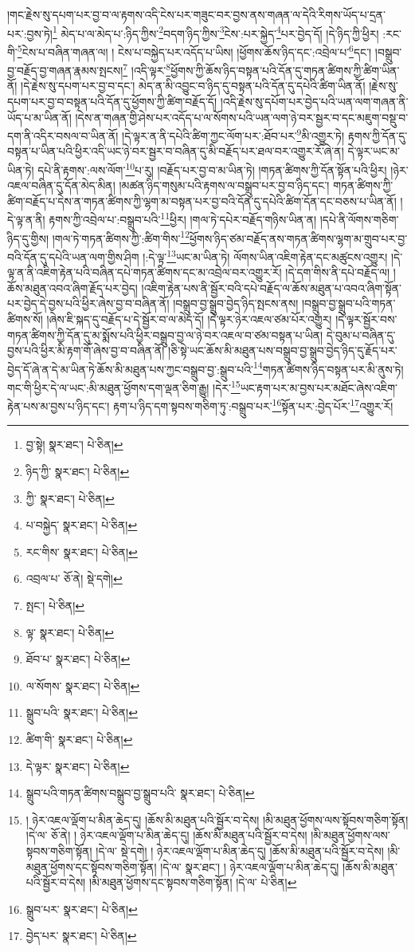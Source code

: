 །གང་རྗེས་སུ་དཔག་པར་བྱ་བ་ལ་རྟགས་འདི་ངེས་པར་གཟུང་བར་བྱས་ནས་གཞན་ལ་དེའི་རིགས་ཡོད་པ་དྲན་པར་:བྱས་ཏེ།\footnote{བྱ་སྟེ།  སྣར་ཐང་།  པེ་ཅིན། } མེད་པ་ལ་མེད་པ་:ཉིད་ཀྱིས་\footnote{ཉིད་ཀྱི་  སྣར་ཐང་།  པེ་ཅིན། }བདག་ཉིད་ཀྱིས་\footnote{ཀྱི་  སྣར་ཐང་།  པེ་ཅིན། }ངེས་:པར་སྐྱེད་\footnote{པ་བསྐྱེད་  སྣར་ཐང་།  པེ་ཅིན། }པར་བྱེད་དོ། །དེ་ཉིད་ཀྱི་ཕྱིར། :རང་གི་\footnote{རང་གིས་  སྣར་ཐང་།  པེ་ཅིན། }ངེས་པ་བཞིན་གཞན་ལ། །
ངེས་པ་བསྐྱེད་པར་འདོད་པ་ཡིས། །ཕྱོགས་ཆོས་ཉིད་དང་:འབྲེལ་པ་\footnote{འབྲལ་པ་  ཅོ་ནེ།  སྡེ་དགེ། }དང་། །བསྒྲུབ་བྱ་བརྗོད་བྱ་གཞན་རྣམས་སྤངས།\footnote{སྤང་།  པེ་ཅིན། } །འདི་ལྟར་\footnote{ལྟ་  སྣར་ཐང་།  པེ་ཅིན། }ཕྱོགས་ཀྱི་ཆོས་ཉིད་བསྟན་པའི་དོན་དུ་གཏན་ཚིགས་ཀྱི་ཚིག་ཡིན་ནོ། །དེ་རྗེས་སུ་དཔག་པར་བྱ་བ་དང་། མེད་ན་མི་འབྱུང་བ་ཉིད་དུ་བསྟན་པའི་དོན་དུ་དཔེའི་ཚིག་ཡིན་ནོ། །རྗེས་སུ་དཔག་པར་བྱ་བ་བསྟན་པའི་དོན་དུ་ཕྱོགས་ཀྱི་ཚིག་བརྗོད་དོ། །འདི་རྗེས་སུ་དཔོག་པར་བྱེད་པའི་ཡན་ལག་གཞན་ནི་ཡོད་པ་མ་ཡིན་ནོ། །དེས་ན་གཞན་གྱི་ཤེས་པར་འདོད་པ་ལ་སོགས་པའི་ཡན་ལག་ཉེ་བར་སྦྱར་བ་དང་མཇུག་བསྡུ་བ་དག་ནི་འདིར་བསལ་བ་ཡིན་ནོ། །དེ་ལྟར་ན་ནི་དཔེའི་ཚིག་ཀྱང་ལོག་པར་:ཐོབ་པར་\footnote{ཐོབ་པ་  སྣར་ཐང་།  པེ་ཅིན། }མི་འགྱུར་ཏེ། རྟགས་ཀྱི་དོན་དུ་བསྟན་པ་ཡིན་པའི་ཕྱིར་འདི་ཡང་ཉེ་བར་སྦྱར་བ་བཞིན་དུ་མི་བརྗོད་པར་ཐལ་བར་འགྱུར་རོ་ཞེ་ན། དེ་ལྟར་ཡང་མ་ཡིན་ཏེ། དཔེ་ནི་རྟགས་:ལས་ལོག་\footnote{ལ་སོགས་  སྣར་ཐང་།  པེ་ཅིན། }པ་རུ། །བརྗོད་པར་བྱ་བ་མ་ཡིན་ཏེ། །གཏན་ཚིགས་ཀྱི་དོན་སྟོན་པའི་ཕྱིར། །ཉེར་འཇལ་བཞིན་དུ་དོན་མེད་མིན། །མཚན་ཉིད་གསུམ་པའི་རྟགས་ལ་བསྒྲུབ་པར་བྱ་བ་ཉིད་དང་། གཏན་ཚིགས་ཀྱི་ཚིག་བརྗོད་པ་དེས་ན་གཏན་ཚིགས་ཀྱི་ལྷག་མ་བསྟན་པར་བྱ་བའི་དོན་དུ་དཔེའི་ཚིག་དོན་དང་བཅས་པ་ཡིན་ནོ། །དེ་ལྟ་ན་ནི། རྟགས་ཀྱི་འབྲེལ་པ་:བསྒྲུབ་པའི་\footnote{སྒྲུབ་པའི་  སྣར་ཐང་།  པེ་ཅིན། }ཕྱིར། །གལ་ཏེ་དཔེར་བརྗོད་གཉིས་ཡིན་ན། །དཔེ་ནི་ལོགས་གཅིག་ཉིད་དུ་གྱིས། །གལ་ཏེ་གཏན་ཚིགས་ཀྱི་:ཚིག་གིས་\footnote{ཚིག་གི་  སྣར་ཐང་།  པེ་ཅིན། }ཕྱོགས་ཉིད་ཙམ་བརྗོད་ནས་གཏན་ཚིགས་ལྷག་མ་གྲུབ་པར་བྱ་བའི་དོན་དུ་དཔེའི་ཡན་ལག་གྱིས་ཤིག །:དེ་ལྟ་\footnote{དེ་ལྟར་  སྣར་ཐང་།  པེ་ཅིན། }ཡང་མ་ཡིན་ཏེ། ལོགས་ཡིན་འཇིག་རྟེན་དང་མཚུངས་འགྱུར། །དེ་ལྟ་ན་ནི་འཇིག་རྟེན་པའི་བཞིན་དཔེ་གཏན་ཚིགས་དང་མ་འབྲེལ་བར་འགྱུར་རོ། །དེ་དག་གིས་ནི་དཔེ་བརྗོད་ལ། །ཆོས་མཐུན་འབའ་ཞིག་རྗོད་པར་བྱེད། །འཇིག་རྟེན་པས་ནི་སྦྱོར་བའི་དཔེ་བརྗོད་ལ་ཆོས་མཐུན་པ་འབའ་ཞིག་སྟོན་པར་བྱེད་དེ་བྱས་པའི་ཕྱིར་ཞེས་བྱ་བ་བཞིན་ནོ། །བསྒྲུབ་བྱ་སྒྲུབ་བྱེད་ཉིད་སྤངས་ནས། །བསྒྲུབ་བྱ་སྒྲུབ་པའི་གཏན་ཚིགས་སོ། །ཞེས་ཇི་སྐད་དུ་བརྗོད་པ་དེ་སྦྱོར་བ་ལ་མེད་དོ། །དེ་ལྟར་ཉེར་འཇལ་ཙམ་པོར་འགྱུར། །དེ་ལྟར་སྦྱོར་བས་གཏན་ཚིགས་ཀྱི་དོན་དུ་མ་སྨོས་པའི་ཕྱིར་བསྒྲུབ་བྱ་ལ་ཉེ་བར་འཇལ་བ་ཙམ་བསྟན་པ་ཡིན། དེ་བུམ་པ་བཞིན་དུ་བྱས་པའི་ཕྱིར་མི་རྟག་གོ་ཞེས་བྱ་བ་བཞིན་ནོ། །ཅི་སྟེ་ཡང་ཆོས་མི་མཐུན་པས་བསྒྲུབ་བྱ་སྒྲུབ་བྱེད་ཉིད་དུ་རྗོད་པར་བྱེད་དོ་ཞེ་ན་དེ་མ་ཡིན་ཏེ་ཆོས་མི་མཐུན་པས་ཀྱང་བསྒྲུབ་བྱ་:སྒྲུབ་པའི་\footnote{སྒྲུབ་པའི་གཏན་ཚིགས་བསྒྲུབ་བྱ་སྒྲུབ་པའི་  སྣར་ཐང་།  པེ་ཅིན། }གཏན་ཚིགས་ཉིད་བསྟན་པར་མི་ནུས་ཏེ། གང་གི་ཕྱིར་དེ་ལ་ཡང་:མི་མཐུན་ཕྱོགས་དག་ལྡན་ཅིག་རྒྱུ། །དེར་\footnote{། ཉེར་འཇལ་ལྡོག་པ་མིན་ཆེད་དུ། །ཆོས་མི་མཐུན་པའི་སྦྱོར་བ་དེས། །མི་མཐུན་ཕྱོགས་ལས་སྟོབས་གཅིག་སྟོན། །དེ་ལ་  ཅོ་ནེ། ། ཉེར་འཇལ་ལྡོག་པ་མིན་ཆེད་དུ། །ཆོས་མི་མཐུན་པའི་སྦྱོར་བ་དེས། །མི་མཐུན་ཕྱོགས་ལས་སྟབས་གཅིག་སྟོན། །དེ་ལ་  སྡེ་དགེ། ། ཉེར་འཇལ་ལྡོག་པ་མིན་ཆེད་དུ། །ཆོས་མི་མཐུན་པའི་སྦྱོར་བ་དེས། །མི་མཐུན་ཕྱོགས་དང་སྟོབས་གཅིག་སྟོན། །དེ་ལ་  སྣར་ཐང་། ། ཉེར་འཇལ་ལྡོག་པ་མིན་ཆེད་དུ། །ཆོས་མི་མཐུན་པའི་སྦྱོར་བ་དེས། །མི་མཐུན་ཕྱོགས་དང་སྟབས་གཅིག་སྟོན། །དེ་ལ་  པེ་ཅིན། }ཡང་རྟག་པར་མ་བྱས་པར་མཐོང་ཞེས་འཇིག་རྟེན་པས་མ་བྱས་པ་ཉིད་དང་། རྟག་པ་ཉིད་དག་སྟབས་གཅིག་ཏུ་:བསྒྲུབ་པར་\footnote{སྒྲུབ་པར་  སྣར་ཐང་།  པེ་ཅིན། }སྟོན་པར་:བྱེད་པོར་\footnote{བྱེད་པར་  སྣར་ཐང་།  པེ་ཅིན། }འགྱུར་རོ། 